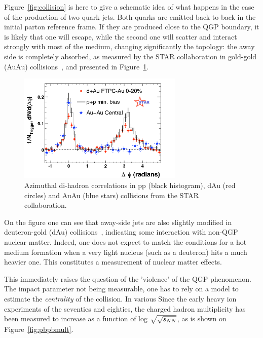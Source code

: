Figure~\ref{fig:collision} is here to give a schematic idea of what
happens in the case of the production of two quark jets. Both quarks
are emitted back to back in the initial parton reference frame. If
they are produced close to the QGP boundary, it is likely that one
will escape, while the second one will scatter and interact
strongly with most of the medium, changing significantly the topology:
the away side is completely absorbed, as measured by the STAR
collaboration in gold-gold (AuAu) collisions~\cite{starquenching}, and
presented in Figure~\ref{fig:jet_star}.
\begin{figure}[h]
\begin{center}
  \includegraphics[width=0.7\textwidth]{Chapters/pQCD/jetstar.png}
 \caption{Azimuthal di-hadron correlations in pp (black histogram), dAu (red circles) and AuAu (blue stars) collisions from the STAR collaboration.}
 \label{fig:jet_star}
\end{center}
\end{figure}



On the figure one can see that away-side jets are also slightly modified in
deuteron-gold (dAu) collisions~\cite{starquenching}, indicating some interaction with
non-QGP nuclear matter. Indeed, one does not expect to match the
conditions for a hot medium formation when a very light nucleus (such
as a deuteron) hits a much heavier one. This constitutes a measurement of
nuclear matter effects.

This immediately raises the question of the 'violence' of the QGP
phenomenon. The impact parameter not being measurable, one has to rely
on a model to estimate the \textit{centrality} of the collision.
In various Since the early heavy ion experiments of the seventies and eighties,
the charged hadron multiplicity has been measured to increase
as a function of log $\sqrt{\sqrt{s_{NN}}}$, as is shown on Figure~\ref{fig:pbpbmult}. 

